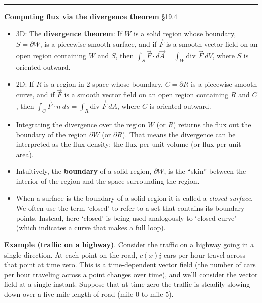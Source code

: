 \documentclass[12pt,letterpaper,noanswers]{exam}
\newcommand{\mb}[1]{\underline{#1}}
\begin{document}
\vspace{0.2cm}
\hrule
\vspace{0.2cm}

\noindent\textbf{Computing flux via the divergence theorem} \S 19.4
\begin{tcolorbox}
\begin{itemize}
\itemsep0em
    \item 3D: The \textbf{divergence theorem}: If $W$ is a solid region whose boundary, $S=\partial W$, is a piecewise smooth surface, and if $\vec F$ is a smooth vector field on an open region containing $W$ and $S$, then $\displaystyle \int_S \vec F\cdot d\vec A = \int_W \text{div }\vec F\ dV$, where $S$ is oriented outward.  
    \item 2D: If $R$ is a region in $2$-space whose boundary, $C = \partial R$ is a piecewise smooth curve, and if $\vec F$ is a smooth vector field on an open region containing $R$ and $C$, then $\displaystyle \int_C \vec F\cdot \underline n\ ds = \int_R \text{div }\vec F\ dA$, where $C$ is oriented outward.
    \item Integrating the divergence over the region $W$ (or $R$) returns the flux out the boundary of the region $\partial W$ (or $\partial R$).  That means the divergence can be interpreted as the flux density: the flux per unit volume (or flux per unit area).
    \item Intuitively, the \textbf{boundary} of a solid region, $\partial W$, is the ``skin'' between the interior of the region and the space surrounding the region.
    \item When a surface is the boundary of a solid region it is called a \emph{closed surface}.  We often use the term `closed' to refer to a set that contains its boundary points.  Instead, here `closed' is being used analogously to `closed curve' (which indicates a curve that makes a full loop).
\end{itemize}


\end{tcolorbox}
\noindent\textbf{Example (traffic on a highway)}.  Consider the traffic on a highway going in a single direction.  At each point on the road, $c(x)\mb i$ cars per hour travel across that point at time zero.  This is a time-dependent vector field (the number of cars per hour traveling across a point changes over time), and we'll consider the vector field at a single instant.  Suppose that at time zero the traffic is steadily slowing down over a five mile length of road (mile $0$ to mile $5$).
\end{document}
